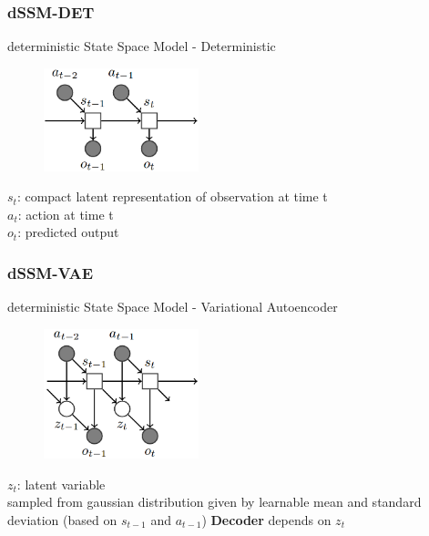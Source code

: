 \begin{frame}
	\frametitle{dSSM-DET}
	\vspace{-10mm}
	deterministic State Space Model - Deterministic
	\begin{multicols}{2}
		\begin{figure}[h]
			\includegraphics[width=0.4\textwidth]{./latent_i2a_images/dSSM_DET_architecture.png}	
		\end{figure}
		\columnbreak
		$s_t$: compact latent representation of observation at time t\\
		$a_t$: action at time t\\
		$o_t$: predicted output
	\end{multicols}
%	
\end{frame}

\begin{frame}
	\frametitle{dSSM-VAE}
	\vspace{-10mm}
	deterministic State Space Model - Variational Autoencoder
	\begin{multicols}{2}
		\begin{figure}[h]
			\includegraphics[width=0.4\textwidth]{./latent_i2a_images/dSSM_VAE_architecture.png}	
		\end{figure}
		\columnbreak
		$z_t$: latent variable\\
		 sampled from gaussian distribution given by learnable mean and standard deviation (based on $s_{t-1}$ and $a_{t-1}$)
		\textbf{Decoder} depends on $z_t$
	\end{multicols}
\end{frame}


